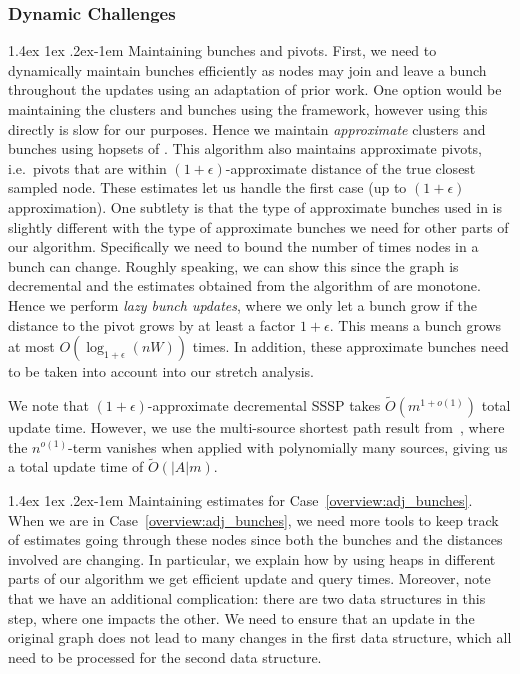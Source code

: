 \documentclass[11pt]{article}
\makeatletter
\theoremstyle{definition}
\theoremstyle{remark}
\renewcommand{\paragraph}{%
  \@startsection{paragraph}{4}%
  {\z@}{1.4ex \@plus 1ex \@minus .2ex}{-1em}%
  {\normalfont\normalsize\bfseries}%
}
\makeatother
\begin{document}
\begin{titlepage}
    
\subsubsection{Dynamic Challenges}\label{sec:overview_dynamic}
\paragraph{Maintaining bunches and pivots.}
First, we need to dynamically maintain bunches efficiently as nodes may join and leave a bunch throughout the updates using an adaptation of prior work. One option would be maintaining the clusters and bunches using the \cite{RZ12} framework, however using this directly is slow for our purposes. Hence we maintain \textit{approximate} clusters and bunches using hopsets of \cite{LN2020}. This algorithm also maintains approximate pivots, i.e.~pivots that are within $(1+\epsilon)$-approximate distance of the true closest sampled node. These estimates let us handle the first case (up to $(1+\epsilon)$ approximation).
One subtlety is that the type of approximate bunches used in \cite{LN2020} is slightly different with the type of approximate bunches we need for other parts of our algorithm. Specifically we need to bound the number of times nodes in a bunch can change. Roughly speaking, we can show this since the graph is decremental and the estimates obtained from the algorithm of \cite{LN2020} are monotone. Hence we perform \emph{lazy bunch updates}, where we only let a bunch grow if the distance to the pivot grows by at least a factor $1+\epsilon$. This means a bunch grows at most $O(\log_{1+\epsilon}(nW))$ times. In addition, these approximate bunches need to be taken into account into our stretch analysis. 

We note that $(1+\epsilon)$-approximate decremental SSSP takes $\tilde O(m^{1+o(1)})$ total update time. However, we use the multi-source shortest path result from~\cite{LN2020}, where the $n^{o(1)}$-term vanishes when applied with polynomially many sources, giving us a total update time of $\tilde O(|A|m)$.
 

\paragraph{Maintaining estimates for Case~\ref{overview:adj_bunches}.}
When we are in Case~\ref{overview:adj_bunches}, we need more tools to keep track of estimates going through these nodes since both the bunches and the distances involved are changing. In particular, we explain how by using heaps in different parts of our algorithm we get efficient update and query times.
Moreover, note that we have an additional complication: there are two data structures in this step, where one impacts the other. We need to ensure that an update in the original graph does not lead to many changes in the first data structure, which all need to be processed for the second data structure. 


\end{titlepage}
\end{document}
